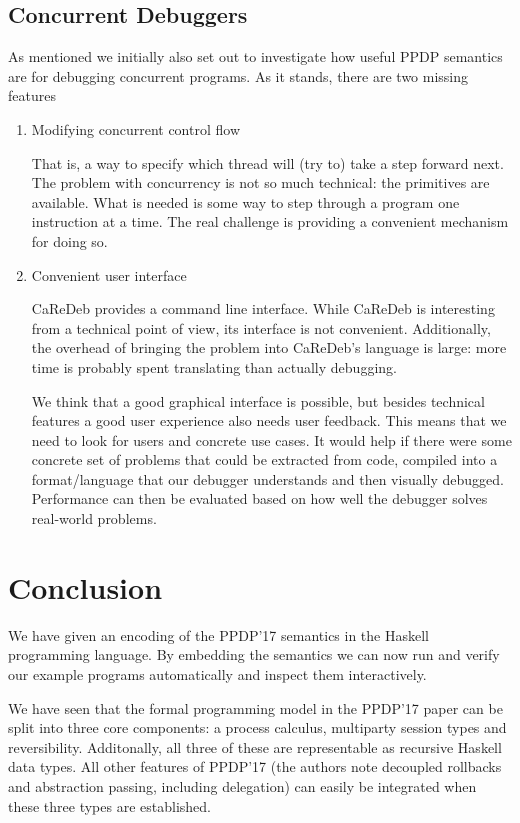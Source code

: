 \documentclass[runningheads,plain]{llncs}
\begin{document}
\subsection{Concurrent Debuggers}\label{concurrent-debuggers}

As mentioned we initially also set out to investigate how useful PPDP
semantics are for debugging concurrent programs. As it stands, there are
two missing features

\begin{enumerate}
\def\labelenumi{\arabic{enumi}.}
\item
  Modifying concurrent control flow

  That is, a way to specify which thread will (try to) take a step
  forward next. The problem with concurrency is not so much technical:
  the primitives are available. What is needed is some way to step
  through a program one instruction at a time. The real challenge is
  providing a convenient mechanism for doing so.
\item
  Convenient user interface

  CaReDeb provides a command line interface. While CaReDeb is
  interesting from a technical point of view, its interface is not
  convenient. Additionally, the overhead of bringing the problem into
  CaReDeb's language is large: more time is probably spent translating
  than actually debugging.

  We think that a good graphical interface is possible, but besides
  technical features a good user experience also needs user feedback.
  This means that we need to look for users and concrete use cases. It
  would help if there were some concrete set of problems that could be
  extracted from code, compiled into a format/language that our debugger
  understands and then visually debugged. Performance can then be
  evaluated based on how well the debugger solves real-world problems.
\end{enumerate}

\section{Conclusion}\label{conclusion}

We have given an encoding of the PPDP'17 semantics in the Haskell
programming language. By embedding the semantics we can now run and
verify our example programs automatically and inspect them
interactively.

We have seen that the formal programming model in the PPDP'17 paper can
be split into three core components: a process calculus, multiparty
session types and reversibility. Additonally, all three of these are
representable as recursive Haskell data types. All other features of
PPDP'17 (the authors note decoupled rollbacks and abstraction passing,
including delegation) can easily be integrated when these three types
are established.
\end{document}
